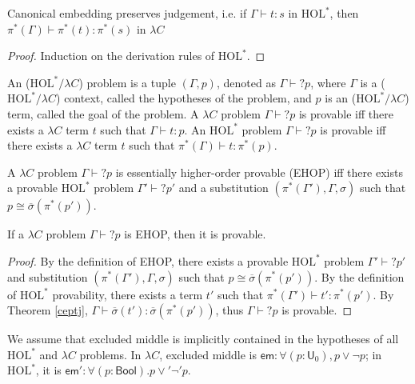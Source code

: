 \begin{theorem}\label{ceptj} Canonical embedding preserves judgement, i.e. if $\Gamma \vdash t : s$ in $\text{HOL}^*$, then
  $\pi^*(\Gamma) \vdash \pi^*(t) : \pi^*(s)$ in $\lambda C$ \end{theorem}
\begin{proof} Induction on the derivation rules of $\text{HOL}^*$. \end{proof}

\begin{definition} An ($\text{HOL}^*/\lambda C$) problem is a tuple $(\Gamma, p)$, denoted
  as $\Gamma \vdash? p$, where $\Gamma$ is a ($\text{HOL}^*/\lambda C$)
  context, called the hypotheses of the problem, and $p$ is an
  ($\text{HOL}^*/\lambda C$) term, called the goal of the problem. A $\lambda C$ problem
  $\Gamma \vdash? p$ is provable iff there exists a $\lambda C$ term $t$ such that
  $\Gamma \vdash t : p$. An $\text{HOL}^*$ problem $\Gamma \vdash? p$ is provable iff there exists
  a $\lambda C$ term $t$ such that $\pi^*(\Gamma) \vdash t : \pi^*(p)$.
\end{definition}

\begin{definition} A $\lambda C$ problem $\Gamma \vdash?  p$ is essentially higher-order provable (EHOP)
  iff there exists a provable $\text{HOL}^*$ problem $\Gamma' \vdash? p'$ and a substitution
  $(\pi^*(\Gamma'), \Gamma, \sigma)$ such that $p \cong \overline{\sigma}(\pi^*(p'))$.
\end{definition}

\begin{theorem}
  If a $\lambda C$ problem $\Gamma \vdash? p$ is EHOP, then it is provable.
\end{theorem}
\begin{proof} By the definition of EHOP, there exists a provable $\text{HOL}^*$ problem
  $\Gamma' \vdash? p'$ and substitution $(\pi^*(\Gamma'), \Gamma, \sigma)$ such that
  $p \cong \overline{\sigma}(\pi^*(p'))$. By the definition of $\text{HOL}^*$ provability, there exists
  a term $t'$ such that $\pi^*(\Gamma') \vdash t' : \pi^*(p')$. By Theorem \ref{ceptj},
  $\Gamma \vdash \overline{\sigma}(t') : \overline{\sigma}(\pi^*(p'))$, thus $\Gamma \vdash? p$
  is provable.
\end{proof}

We assume that excluded middle is implicitly contained in the hypotheses of all
$\text{HOL}^*$ and $\lambda C$ problems. In $\lambda C$, excluded middle is
$\mathsf{em} : \forall (p : \mathsf{U}_0), p \lor \neg p$; in $\text{HOL}^*$, it is
$\mathsf{em}' : \forall (p : \mathsf{Bool}). p \lor' \neg' p$.

